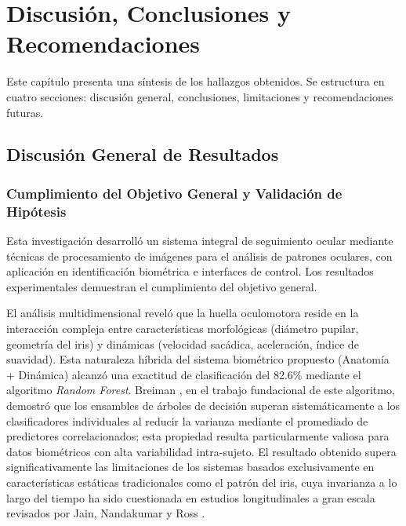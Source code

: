 
\chapter{Discusión, Conclusiones y Recomendaciones}

Este capítulo presenta una síntesis de los hallazgos obtenidos.
Se estructura en cuatro secciones: discusión general, conclusiones, limitaciones y recomendaciones futuras.
\section{Discusión General de Resultados}

\subsection{Cumplimiento del Objetivo General y Validación de Hipótesis}

Esta investigación desarrolló un sistema integral de seguimiento ocular mediante técnicas de procesamiento de imágenes para el análisis de patrones oculares, con aplicación en identificación biométrica e interfaces de control.
Los resultados experimentales demuestran el cumplimiento del objetivo general.

El análisis multidimensional reveló que la huella oculomotora reside en la interacción compleja entre características morfológicas (diámetro pupilar, geometría del iris) y dinámicas (velocidad sacádica, aceleración, índice de suavidad).
Esta naturaleza híbrida del sistema biométrico propuesto (Anatomía + Dinámica) alcanzó una exactitud de clasificación del 82.6\% mediante el algoritmo \textit{Random Forest}.
Breiman \cite{breiman2001}, en el trabajo fundacional de este algoritmo, demostró que los ensambles de árboles de decisión superan sistemáticamente a los clasificadores individuales al reducir la varianza mediante el promediado de predictores correlacionados;
esta propiedad resulta particularmente valiosa para datos biométricos con alta variabilidad intra-sujeto.
El resultado obtenido supera significativamente las limitaciones de los sistemas basados exclusivamente en características estáticas tradicionales como el patrón del iris, cuya invarianza a lo largo del tiempo ha sido cuestionada en estudios longitudinales a gran escala revisados por Jain, Nandakumar y Ross \cite{jain2016biometric}.
